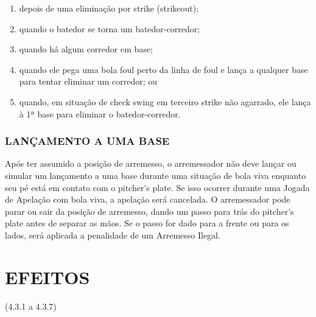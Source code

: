 \begin{multicols}{2}
\begin{enumerate}[label=\alph*)]
		\begin{enumerate}[label=\roman* -]
			\item depois de uma elimina\c{c}\~ao por \gls{strike} (\gls{strikeout}); 
			\item quando o batedor se torna um batedor-corredor; 
			\item quando h\'a algum corredor em base; 
			\item quando ele pega uma bola \gls{foul} perto da linha de \gls{foul} e lan\c{c}a a qualquer base para tentar eliminar um corredor; ou 
			\item quando, em situa\c{c}\~ao de \gls{check swing} em terceiro \gls{strike} n\~ao agarrado, ele lan\c{c}a \`a 1ª base para eliminar o batedor-corredor. 
		\end{enumerate}
	\end{enumerate}
	
	\subsubsection{LAN\c{C}AMENTO A UMA BASE}
	Ap\'os ter assumido a posi\c{c}\~ao de arremesso, o arremessador n\~ao deve lan\c{c}ar ou simular um lan\c{c}amento a uma base durante uma situa\c{c}\~ao de bola viva enquanto seu p\'e est\'a em contato com o \gls{pitcher's plate}. Se isso ocorrer durante uma Jogada de Apela\c{c}\~ao com bola viva, a apela\c{c}\~ao ser\'a cancelada. O arremessador pode parar ou sair da posi\c{c}\~ao de arremesso, dando um passo para tr\'as do \gls{pitcher's plate} antes de separar as m\~aos. Se o passo for dado para a frente ou para os lados, ser\'a aplicada a penalidade de um Arremesso Ilegal. 
	
\end{multicols}

\section*{EFEITOS}

(4.3.1 a 4.3.7) 

